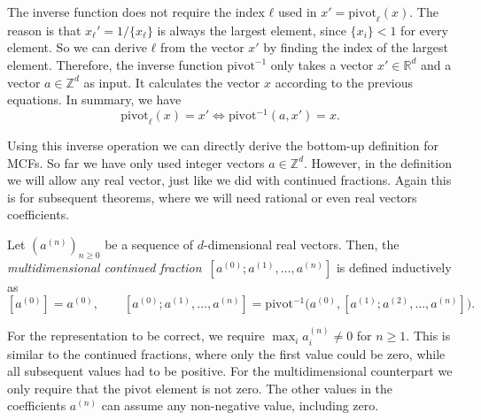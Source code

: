 The inverse function does not require the index $ℓ$ used in $x' = \mathrm{pivot}_ℓ(x)$.
The reason is that $x_ℓ' = 1/\{x_ℓ\}$ is always the largest element, since $\{x_i\} < 1$ for every element.
So we can derive $ℓ$ from the vector $x'$ by finding the index of the largest element.
Therefore, the inverse function $\mathrm{pivot}^{-1}$ only takes
a vector $x' ∈ ℝ^d$ and a vector $a ∈ ℤ^d$ as input.
It calculates the vector $x$ according to the previous equations.
In summary, we have
\[
  \mathrm{pivot}_ℓ(x) = x' \iff \mathrm{pivot}^{-1}(a, x') = x.
\]

Using this inverse operation we can directly derive the bottom-up definition for MCFs.
So far we have only used integer vectors $a ∈ ℤ^d$.
However, in the definition we will allow any real vector,
just like we did with continued fractions.
Again this is for subsequent theorems, where we will need rational or even real vectors coefficients.

\begin{definition}
  Let $(a^{(n)})_{n ≥ 0}$ be a sequence of $d$-dimensional real vectors.
  Then, the \emph{multidimensional continued fraction}~$[a^{(0)}; a^{(1)}, …, a^{(n)}]$ is defined inductively as
  \[
    [a^{(0)}] = a^{(0)},
    \qquad
    [a^{(0)}; a^{(1)}, …, a^{(n)}]
    = \mathrm{pivot}^{-1}\big(a^{(0)}, [a^{(1)}; a^{(2)}, …, a^{(n)}]\big).
  \]
\end{definition}

For the representation to be correct, we require $\max_i a_i^{(n)} ≠ 0$ for $n ≥ 1$.
This is similar to the continued fractions, where only the first value could be zero,
while all subsequent values had to be positive.
For the multidimensional counterpart we only require that the pivot element is not zero.
The other values in the coefficients $a^{(n)}$ can assume any non-negative value, including zero.

